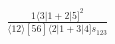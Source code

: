 \documentclass[varwidth, border=5pt]{standalone}
\begin{document}
\begin{my}
$\begin{gathered}
\scriptscriptstyle\frac{1⟨3|1+2|5]^2}{⟨12⟩[56]⟨2|1+3|4]s_{123}}
\end{gathered}$
\end{my}
\end{document}
